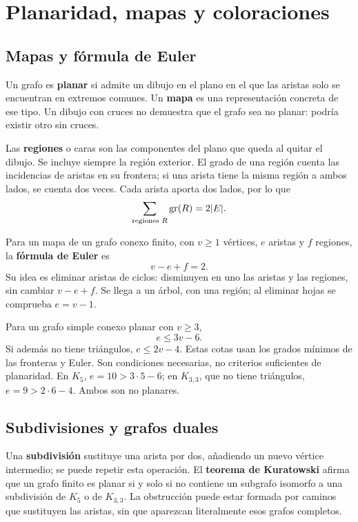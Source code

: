 \chapter{Planaridad, mapas y coloraciones}
\label{md:planaridad}

\section{Mapas y fórmula de Euler}
\label{md:euler-plano}

Un grafo es \textbf{planar} si admite un dibujo en el plano en el que
las aristas solo se encuentran en extremos comunes.
Un \textbf{mapa} es una representación concreta de ese tipo.
Un dibujo con cruces no demuestra que el grafo sea no planar:
podría existir otro sin cruces.

Las \textbf{regiones} o caras son las componentes del plano que queda
al quitar el dibujo. Se incluye siempre la región exterior.
El grado de una región cuenta las incidencias de aristas en su frontera;
si una arista tiene la misma región a ambos lados, se cuenta dos veces.
Cada arista aporta dos lados, por lo que
\[
 \sum_{\text{regiones }R}\operatorname{gr}(R)=2|E|.
\]

Para un mapa de un grafo conexo finito, con $v\ge1$ vértices,
$e$ aristas y $f$ regiones, la \textbf{fórmula de Euler} es
\[
 \boxed{v-e+f=2.}
\]
Su idea es eliminar aristas de ciclos: disminuyen en uno las aristas
y las regiones, sin cambiar $v-e+f$. Se llega a un árbol, con una
región; al eliminar hojas se comprueba $e=v-1$.

Para un grafo simple conexo planar con $v\ge3$,
\[
 e\le3v-6.
\]
Si además no tiene triángulos, $e\le2v-4$.
Estas cotas usan los grados mínimos de las fronteras y Euler.
Son condiciones necesarias, no criterios suficientes de planaridad.
En $K_5$, $e=10>3\cdot5-6$; en $K_{3,3}$, que no tiene triángulos,
$e=9>2\cdot6-4$. Ambos son no planares.

\section{Subdivisiones y grafos duales}

Una \textbf{subdivisión} sustituye una arista por dos, añadiendo
un nuevo vértice intermedio; se puede repetir esta operación.
El \textbf{teorema de Kuratowski} afirma que un grafo finito es planar
si y solo si no contiene un subgrafo isomorfo a una subdivisión
de $K_5$ o de $K_{3,3}$.
La obstrucción puede estar formada por caminos que sustituyen
las aristas, sin que aparezcan literalmente esos grafos completos.

